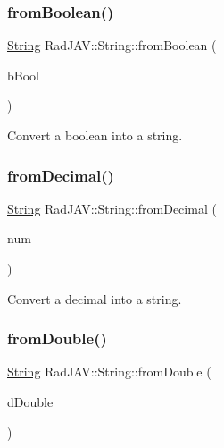 \subsubsection{\texorpdfstring{from\+Boolean()}{fromBoolean()}}
{\footnotesize\ttfamily \mbox{\hyperlink{class_rad_j_a_v_1_1_string}{String}} Rad\+J\+A\+V\+::\+String\+::from\+Boolean (\begin{DoxyParamCaption}\item[{bool}]{b\+Bool }\end{DoxyParamCaption})\hspace{0.3cm}{\ttfamily [static]}}



Convert a boolean into a string. 

\mbox{\label{class_rad_j_a_v_1_1_string_a961d271c79d33f7700e980e6ef6e5b8b}} 
\subsubsection{\texorpdfstring{from\+Decimal()}{fromDecimal()}}
{\footnotesize\ttfamily \mbox{\hyperlink{class_rad_j_a_v_1_1_string}{String}} Rad\+J\+A\+V\+::\+String\+::from\+Decimal (\begin{DoxyParamCaption}\item[{R\+D\+E\+C\+I\+M\+AL}]{num }\end{DoxyParamCaption})\hspace{0.3cm}{\ttfamily [static]}}



Convert a decimal into a string. 

\mbox{\label{class_rad_j_a_v_1_1_string_a5501161ff54528c58720c23a30397519}} 
\subsubsection{\texorpdfstring{from\+Double()}{fromDouble()}}
{\footnotesize\ttfamily \mbox{\hyperlink{class_rad_j_a_v_1_1_string}{String}} Rad\+J\+A\+V\+::\+String\+::from\+Double (\begin{DoxyParamCaption}\item[{double}]{d\+Double }\end{DoxyParamCaption})\hspace{0.3cm}{\ttfamily [static]}}



